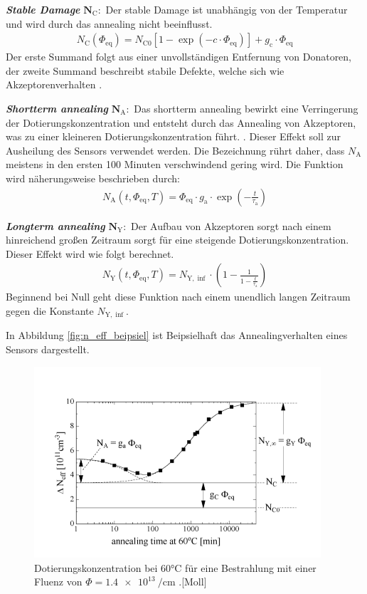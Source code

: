 \textbf{\textit{Stable Damage}} $\symbf{N_{\mathrm{C}}}:$ Der stable Damage ist unabhängig von der Temperatur und wird durch das annealing nicht beeinflusst.
\begin{align}
  N_{\mathrm{C}}(\Phi_{\mathrm{eq}}) = N_{\mathrm{C0}}[1-\exp{(-c \cdot \Phi_{\mathrm{eq}})}] + g_{\mathrm{c}} \cdot \Phi_{\mathrm{eq}}
\end{align}
Der erste Summand folgt aus einer unvollständigen Entfernung von Donatoren, der zweite Summand beschreibt stabile Defekte, welche sich wie Akzeptorenverhalten \cite{beyer}.


\textbf{\textit{Shortterm annealing}} $\symbf{N_{\mathrm{A}}}:$ Das shortterm annealing bewirkt eine Verringerung der Dotierungskonzentration und entsteht durch
das Annealing von Akzeptoren, was zu einer kleineren Dotierungskonzentration führt. . Dieser Effekt soll
zur Ausheilung des Sensors verwendet werden. Die Bezeichnung rührt daher, dass $N_{\mathrm{A}}$ meistens in den ersten 100 Minuten verschwindend gering wird. Die
Funktion wird näherungsweise beschrieben durch:
\begin{align}
  N_{\mathrm{A}}(t, \Phi_{\mathrm{eq}}, T) = \Phi_{\mathrm{eq}} \cdot g_{\mathrm{a}} \cdot \exp{\left(-\frac{t}{\tau_{\mathrm{a}}}\right)}
\end{align}


\textbf{\textit{Longterm annealing}} $\symbf{N_{\mathrm{Y}}}:$ Der Aufbau von
Akzeptoren sorgt nach einem hinreichend großen Zeitraum sorgt für eine steigende
Dotierungskonzentration. Dieser Effekt wird wie folgt berechnet.
\begin{align}
  N_{\mathrm{Y}}(t, \Phi_{\mathrm{eq}}, T)     = N_{\mathrm{Y , \inf}}\cdot \left(1 - \frac{1}{1 - \frac{t}{\tau_{\mathrm{a}}}}\right)
\end{align}
Beginnend bei Null geht diese Funktion nach einem unendlich langen Zeitraum gegen die Konstante $N_{\mathrm{Y, \inf}}$.

In Abbildung \ref{fig:n_eff_beipsiel} ist Beipsielhaft das Annealingverhalten eines
Sensors dargestellt.

\begin{figure}
  \includegraphics[width=0.95\textwidth]{logos/n_eff_beispiel.PNG}
  \caption{Dotierungskonzentration bei 60°C für eine Bestrahlung mit einer Fluenz
  von $\Phi=\SI{1.4e13}{\per\centi\meter}$ .[Moll]}
  \label{fig:n_eff_beispiel}
\end{figure}



